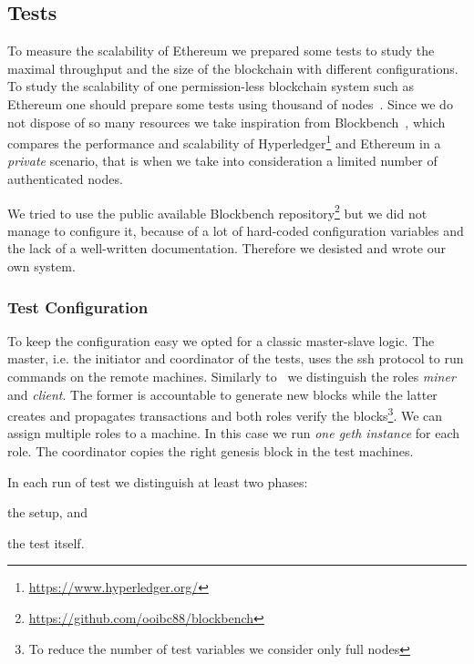 \subsection{Tests}

To measure the scalability of Ethereum we prepared some tests to study
the maximal throughput and the size of the blockchain with different
configurations.
To study the scalability of one permission-less blockchain system such as
Ethereum one should prepare some tests using thousand of
nodes~\cite{bib:securityAndScalabilityPoW, bib:algorand}.
Since we do not dispose of so many resources we take inspiration from
Blockbench~\cite{blockbench}, which compares the performance and scalability
of Hyperledger\footnote{\url{https://www.hyperledger.org/}} and Ethereum in a
\emph{private} scenario, that is when
we take into consideration a limited number of authenticated nodes.

We tried to use the public available Blockbench
repository\footnote{\url{https://github.com/ooibc88/blockbench}}
but we did not manage to configure it, because of a lot of hard-coded
configuration variables and the lack of a well-written documentation.
Therefore we desisted and wrote our own system.


\subsubsection{Test Configuration}

To keep the configuration easy we opted for a classic master-slave logic.
The master, i.e. the initiator and coordinator of the tests, uses the ssh
protocol to run commands on the remote machines.
Similarly to~\cite{blockbench} we distinguish the roles \emph{miner} and
\emph{client}. The former is accountable to generate new blocks while the
latter creates and propagates transactions and both roles verify the
blocks\footnote{To reduce the number of test variables we consider only
    full nodes}.
We can assign multiple roles to a machine. In this case we run
\emph{one geth instance} for each role.
The coordinator copies the right genesis block in the test machines.



In each run of test we distinguish at least two phases:
\begin{enumerate*}
    \item the setup, and
    \item the test itself.
\end{enumerate*}


